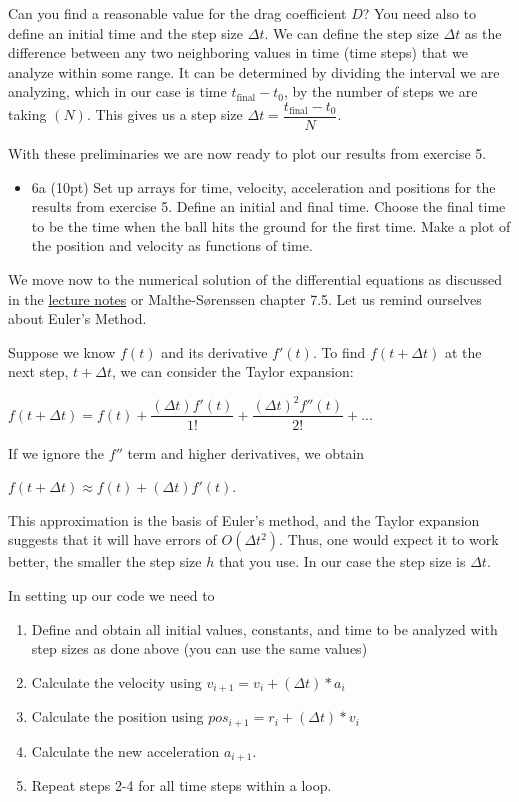 \documentclass[%
oneside,                 %
final,                   %
10pt]{article}
\begin{document}
\noindent
Can you find a reasonable value for the drag coefficient $D$?
You need also to define an initial time and 
the step size $\Delta t$. We can define the step size $\Delta t$ as the difference between any
two neighboring values in time (time steps) that we analyze within
some range. It can be determined by dividing the interval we are
analyzing, which in our case is time $t_{\mathrm{final}}-t_0$, by the number of steps we
are taking $(N)$. This gives us a step size $\Delta t = \dfrac{t_{\mathrm{final}}-t_0}{N}$.

With these preliminaries we are now ready to plot our results from exercise 5.

\begin{itemize}
\item 6a (10pt) Set up arrays for time, velocity, acceleration and positions for the results from exercise 5. Define an initial and final time. Choose the final time to be the time when the ball hits the ground for the first time. Make a plot of the position and velocity as functions of time. 
\end{itemize}

\noindent
We move now to the numerical solution of the differential equations as discussed in the \href{{https://mhjensen.github.io/Physics321/doc/pub/motion/html/motion.html}}{lecture notes} or Malthe-Sørenssen chapter 7.5.
Let us remind ourselves about  Euler's Method.

Suppose we know $f(t)$ and its derivative $f'(t)$. To find $f(t+\Delta t)$ at the next step, $t+\Delta t$,
we can consider the Taylor expansion:

$f(t+\Delta t) = f(t) + \dfrac{(\Delta t)f'(t)}{1!} + \dfrac{(\Delta t)^2f''(t)}{2!} + ...$

If we ignore the $f''$ term and higher derivatives, we obtain

$f(t+\Delta t) \approx f(t) + (\Delta t)f'(t)$.

This approximation is the basis of Euler's method, and the Taylor
expansion suggests that it will have errors of $O(\Delta t^2)$.  Thus, one
would expect it to work better, the smaller the step size $h$ that you
use. In our case the step size is $\Delta t$. 

In setting up our code we need to

\begin{enumerate}
\item Define and obtain all initial values, constants, and time to be analyzed with step sizes as done above (you can use the same values)

\item Calculate the velocity using $v_{i+1} = v_{i} + (\Delta t)*a_{i}$

\item Calculate the position using $pos_{i+1} = r_{i} + (\Delta t)*v_{i}$

\item Calculate the new acceleration $a_{i+1}$.

\item Repeat steps 2-4 for all time steps within a loop.

\end{enumerate}
\end{document}
